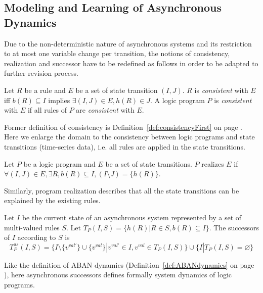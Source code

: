 \subsection{Modeling and Learning of Asynchronous Dynamics}\label{sec:alfit}

Due to the non-deterministic nature of asynchronous systems and its restriction to at most one variable change per transition,
the notions of consistency, realization and successor have to be redefined as follows in order to be adapted to further revision process.

\begin{definition}[Consistency]\label{def:consistencySecond}
	Let $R$ be a rule and $E$ be a set of state transition $(I,J)$.
	$R$ is {\it consistent} with $E$ iff
	$b(R)\subseteq I$ implies $\exists (I,J) \in E, h(R) \in J$.
	A logic program $P$ is {\it consistent} with $E$ if all rules of $P$ are {\it consistent} with $E$.
\end{definition}

Former definition of consistency is Definition~\ref{def:consistencyFirst} on page \pageref{def:consistencyFirst}.
Here we enlarge the domain to the consistency between logic programs and state transitions (time-series data), i.e. all rules are applied in the state transitions. 

\begin{definition}
	Let $P$ be a logic program and $E$ be a set of state transitions.
	$P$ realizes $E$ if $\forall (I,J) \in E, \exists R, b(R) \subseteq I, (I \setminus J) = \{h(R)\}$.
\end{definition}

Similarly, program realization describes that all the state transitions can be explained by the existing rules.

\begin{definition}
	Let $I$ be the current state of an asynchronous system represented by a set of multi-valued rules $S$.
	Let $T_P(I,S) = \{h(R) | R \in S, b(R) \subseteq I\}$.
	The successors of $I$ according to $S$ is
	$$T_P^{as}(I,S) = \{I \setminus \{v^{val'}\} \cup \{v^{val}\} | v^{val'} \in I, v^{val} \in T_P(I,S)\} \cup \{I|T_P(I,S) = \varnothing\}$$ %
\end{definition}

Like the definition of ABAN dynamics (Definition~\ref{def:ABANdynamics} on page \pageref{def:ABANdynamics}), here asynchronous successors defines formally system dynamics of logic programs.

